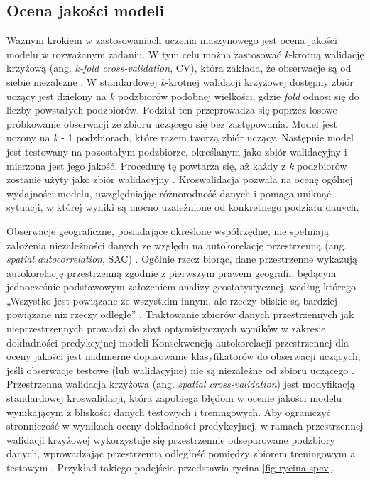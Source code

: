 \documentclass{amuthesis}
\begin{document}
\hypertarget{sec-model-quality-assessment}{%
\subsection{Ocena jakości modeli}\label{sec-model-quality-assessment}}

Ważnym krokiem w zastosowaniach uczenia maszynowego jest ocena jakości
modelu w rozważanym zadaniu. W tym celu można zastosować \emph{k}-krotną
walidację krzyżową (ang. \emph{k-fold cross-validation}, CV), która
zakłada, że obserwacje są od siebie niezależne
\autocite{pohjankukka_2017_scv}. W standardowej \emph{k}-krotnej
walidacji krzyżowej dostępny zbiór uczący jest dzielony na \emph{k}
podzbiorów podobnej wielkości, gdzie \emph{fold} odnosi się do liczby
powstałych podzbiorów. Podział ten przeprowadza się poprzez losowe
próbkowanie obserwacji ze zbioru uczącego się bez zastępowania. Model
jest uczony na \emph{k} - 1 podzbiorach, które razem tworzą zbiór
uczący. Następnie model jest testowany na pozostałym podzbiorze,
określanym jako zbiór walidacyjny i mierzona jest jego jakość. Procedurę
tę powtarza się, aż każdy z \emph{k} podzbiorów zostanie użyty jako
zbiór walidacyjny \autocite{berrar_2018_cv}. Kroswalidacja pozwala na
ocenę ogólnej wydajności modelu, uwzględniając różnorodność danych i
pomaga uniknąć sytuacji, w której wyniki są mocno uzależnione od
konkretnego podziału danych.

Obserwacje geograficzne, posiadające określone współrzędne, nie
spełniają założenia niezależności danych ze względu na autokorelację
przestrzenną (ang. \emph{spatial autocorrelation}, SAC)
\autocite{pohjankukka_2017_scv}. Ogólnie rzecz biorąc, dane przestrzenne
wykazują autokorelację przestrzenną zgodnie z pierwszym prawem
geografii, będącym jednocześnie podstawowym założeniem analizy
geostatystycznej, według którego „Wszystko jest powiązane ze wszystkim
innym, ale rzeczy bliskie są bardziej powiązane niż rzeczy odległe''
\autocite{tobler_1970_first_law_of_geography}. Traktowanie zbiorów
danych przestrzennych jak nieprzestrzennych prowadzi do zbyt
optymistycznych wyników w zakresie dokładności predykcyjnej modeli
\autocite{brenning_2005_scv} Konsekwencją autokorelacji przestrzennej
dla oceny jakości jest nadmierne dopasowanie klasyfikatorów do
obserwacji uczących, jeśli obserwacje testowe (lub walidacyjne) nie są
niezależne od zbioru uczącego \autocite{brenning_2012_scv}. Przestrzenna
walidacja krzyżowa (ang. \emph{spatial cross-validation}) jest
modyfikacją standardowej kroswalidacji, która zapobiega błędom w ocenie
jakości modelu wynikającym z bliskości danych testowych i treningowych.
Aby ograniczyć stronniczość w wynikach oceny dokładności predykcyjnej, w
ramach przestrzennej walidacji krzyżowej wykorzystuje się przestrzennie
odseparowane podzbiory danych, wprowadzając przestrzenną odległość
pomiędzy zbiorem treningowym a testowym \autocite{pohjankukka_2017_scv}.
Przykład takiego podejścia przedstawia rycina \ref{fig-rycina-spcv}.
\end{document}
